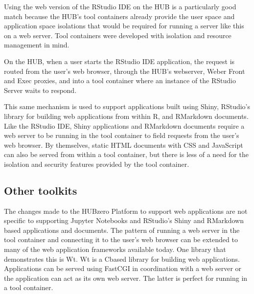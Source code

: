 \documentclass[conference]{../sty/IEEEtran}
\newcommand\CC{C\nolinebreak[4]\hspace{-.05em}\raisebox{.4ex}{\relsize{-3}{\textbf{++}}}\hspace{.25em}}
\begin{document}
Using the web version of the RStudio IDE on the HUB is a particularly good
match because the HUB's tool containers already provide the user space and
application space isolations that would be required for running a server like
this on a web server. Tool containers were developed with isolation and
resource management in mind.

On the HUB, when a user starts the RStudio IDE application, the request is
routed from the user's web browser, through the HUB's webserver, Weber Front and Exec
proxies, and into a tool container where an instance of the RStudio Server
waits to respond.

This same mechanism is used to support applications built using Shiny,
RStudio's library for building web applications from within R, and RMarkdown
documents. Like the RStudio IDE, Shiny applications and RMarkdown documents
require a web server to be running in the tool container to field requests from
the user's web browser. By themselves, static HTML documents with CSS and JavaScript
can also be served from within a tool container, but there is less of a need
for the isolation and security features provided by the tool container.



\subsection {Other toolkits}

The changes made to the HUBzero Platform to support web applications are not
specific to supporting Jupyter Notebooks and RStudio's Shiny and RMarkdown
based applications and documents. The pattern of running a web server in the
tool container and connecting it to the user's web browser can be extended to
many of the web application frameworks available today. One library that
demonstrates this is Wt\cite{wt}. Wt is a \CC based library for building web
applications. Applications can be served using FastCGI in coordination with a
web server or the application can act as its own web server. The latter is
perfect for running in a tool container.

\end{document}
